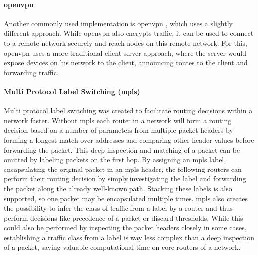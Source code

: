 \paragraph{\Gls{openvpn}} Another commonly used implementation is \Gls{openvpn} \cite{openvpn}, which uses a slightly different approach. While \Gls{openvpn} also encrypts traffic, it can be used to connect to a remote network securely and reach nodes on this remote network. For this, \Gls{openvpn} uses a more traditional client server approach, where the server would expose devices on his network to the client, announcing routes to the client and forwarding traffic.

\paragraph{Multi Protocol Label Switching (\acrshort{mpls})}
\label{mpls}
Multi protocol label switching \cite{rfc3031} was created to facilitate routing decisions within a network faster. Without \acrshort{mpls} each router in a network will form a routing decision based on a number of parameters from multiple packet headers by forming a longest match over addresses and comparing other header values before forwarding the packet. This deep inspection and matching of a packet can be omitted by labeling packets on the first hop. By assigning an \acrshort{mpls} label, encapsulating the original packet in an \acrshort{mpls} header, the following routers can perform their routing decision by simply investigating the label and forwarding the packet along the already well-known path. Stacking these labels is also supported, so one packet may be encapsulated multiple times. \acrshort{mpls} also creates the possibility to infer the class of traffic from a label by a router and thus perform decisions like precedence of a packet or discard thresholds. While this could also be performed by inspecting the packet headers closely in some cases, establishing a traffic class from a label is way less complex than a deep inspection of a packet, saving valuable computational time on core routers of a network.
